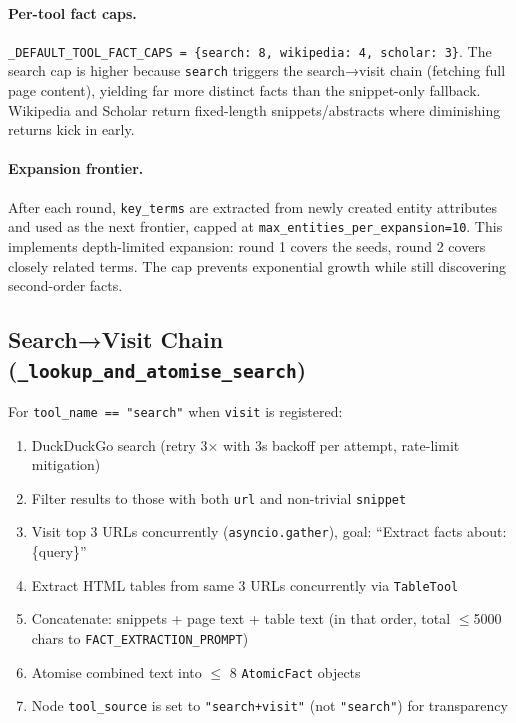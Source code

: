 \documentclass[11pt,a4paper]{article}
\begin{document}
\paragraph{Per-tool fact caps.} \texttt{\_DEFAULT\_TOOL\_FACT\_CAPS = \{search: 8, wikipedia: 4, scholar: 3\}}. The search cap is higher because \texttt{search} triggers the search→visit chain (fetching full page content), yielding far more distinct facts than the snippet-only fallback. Wikipedia and Scholar return fixed-length snippets/abstracts where diminishing returns kick in early.

\paragraph{Expansion frontier.} After each round, \texttt{key\_terms} are extracted from newly created entity attributes and used as the next frontier, capped at \texttt{max\_entities\_per\_expansion=10}. This implements depth-limited expansion: round 1 covers the seeds, round 2 covers closely related terms. The cap prevents exponential growth while still discovering second-order facts.

\subsection{Search→Visit Chain (\texttt{\_lookup\_and\_atomise\_search})}

For \texttt{tool\_name == "search"} when \texttt{visit} is registered:
\begin{enumerate}[leftmargin=*,noitemsep]
  \item DuckDuckGo search (retry 3× with 3s backoff per attempt, rate-limit mitigation)
  \item Filter results to those with both \texttt{url} and non-trivial \texttt{snippet}
  \item Visit top 3 URLs concurrently (\texttt{asyncio.gather}), goal: ``Extract facts about: \{query\}''
  \item Extract HTML tables from same 3 URLs concurrently via \texttt{TableTool}
  \item Concatenate: snippets + page text + table text (in that order, total $\leq$5000 chars to \texttt{FACT\_EXTRACTION\_PROMPT})
  \item Atomise combined text into $\leq$ 8 \texttt{AtomicFact} objects
  \item Node \texttt{tool\_source} is set to \texttt{"search+visit"} (not \texttt{"search"}) for transparency
\end{enumerate}
\end{document}
